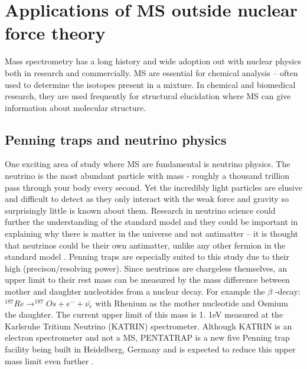 \section{Applications of MS outside nuclear force theory}

Mass spectrometry has a long history and wide adoption out with nuclear physics both in research and commercially.
MS are essential for chemical analysis – often used to determine the isotopes present in a mixture.
In chemical and biomedical research, they are used frequently for structural elucidation where MS can give information about molecular structure. \cite{bhattarai_chapter_2020}

\subsection{Penning traps and neutrino physics}
One exciting area of study where MS are fundamental is neutrino physics.
The neutrino is the most abundant particle with mass - roughly a thousand trillion pass through your body every second. \cite{noauthor_whats_nodate}
Yet the incredibly light particles are elusive and difficult to detect as they only interact with the weak force and gravity so surprisingly little is known about them. \cite{noauthor_what_nodate}
Research in neutrino science could further the understanding of the standard model and they could be important in explaining why there is matter in the universe and not antimatter \cite{gibney_morphing_2015} – it is thought that neutrinos could be their own antimatter, unlike any other fermion in the standard model \cite{blaum_precision_2012}. 
Penning traps are especially suited to this study due to their high (precison/resolving power).
Since neutrinos are chargeless themselves, an upper limit to their rest mass can be measured by the mass difference between mother and daughter nucleotides from a nuclear decay. \cite{eliseev_penning-trap_2013}
For example the $\beta$ -decay: $^{187}Re \longrightarrow ^{187}Os + e^- + \bar{\nu _e}$ with Rhenium as the mother nucleotide and Osmium the daughter. \cite{repp_pentatrap_2012}
The current upper limit of this mass is 1.
1eV measured at the Karlsruhe Tritium Neutrino (KATRIN) spectrometer. \cite{castelvecchi_physicists_2019}
Although KATRIN is an electron spectrometer and not a MS, PENTATRAP is a new five Penning trap facility being built in Heidelberg, Germany and is expected to reduce this upper mass limit even further \cite{repp_pentatrap_2012}.

